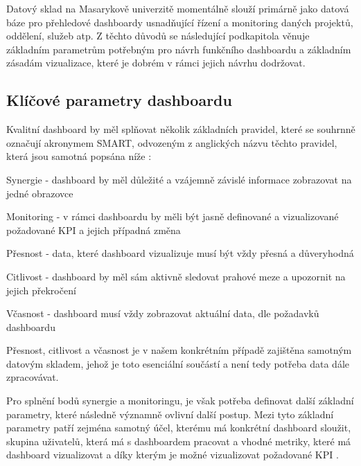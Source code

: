\documentclass[
  digital,     %
  twoside,     %
  lof,         %
  lot,         %
]{fithesis4}
\begin{document}
Datový sklad na Masarykově univerzitě momentálně slouží primárně jako datová báze pro přehledové dashboardy usnadňující řízení a monitoring daných projektů, oddělení, služeb atp. Z těchto důvodů se následující podkapitola věnuje základním parametrům potřebným pro návrh funkčního dashboardu a základním zásadám vizualizace, které je dobrém v rámci jejich návrhu dodržovat.

\subsection{Klíčové parametry dashboardu}
Kvalitní dashboard by měl splňovat několik základních pravidel, které se souhrnně označují akronymem SMART, odvozeným z anglických názvu těchto pravidel, která jsou samotná popsána níže \parencite[s.~1]{Kratochvil2014}:
\begin{compactitem}
    \item Synergie - dashboard by měl důležité a vzájemně závislé informace zobrazovat na jedné obrazovce
    \item Monitoring - v rámci dashboardu by měli být jasně definované a vizualizované požadované KPI a jejich případná změna
    \item Přesnost - data, které dashboard vizualizuje musí být vždy přesná a důveryhodná
    \item Citlivost - dashboard by měl sám aktivně sledovat prahové meze a upozornit na jejich překročení
    \item Včasnost - dashboard musí vždy zobrazovat aktuální data, dle požadavků dashboardu
\end{compactitem}
Přesnost, citlivost a včasnost je v našem konkrétním případě zajištěna samotným datovým skladem, jehož je toto esenciální součástí a není tedy potřeba data dále zpracovávat. 

Pro splnění bodů synergie a monitoringu, je však potřeba definovat další základní parametry, které následně významně ovlivní další postup. Mezi tyto základní parametry patří zejména samotný účel, kterému má konkrétní dashboard sloužit, skupina uživatelů, která má s dashboardem pracovat a vhodné metriky, které má dashboard vizualizovat a díky kterým je možné vizualizovat požadované KPI \parencite[s.~6]{Faron2016thesis}. 
\end{document}
